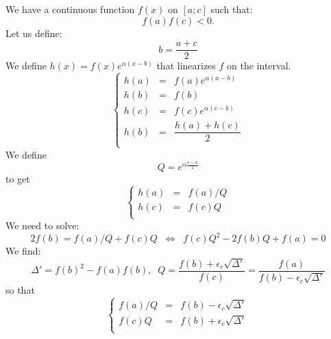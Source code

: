 \documentclass[aps,12pt]{revtex4}
\begin{document}
We have a continuous function $f(x)$ on $[a;c]$ such that:
 $$f(a)f(c)<0.$$
Let us define:
$$
	b = \dfrac{a+c}{2}
$$
We define $h(x)=f(x)e^{\alpha(x-b)}$ that linearizes $f$ on the interval.
$$
\left\lbrace
\begin{array}{rcl}
	h(a) & = & f(a)e^{\alpha(a-b)}\\
	h(b) & = & f(b)\\
	h(c) & = & f(c) e^{\alpha(c-b)}\\
	h(b) & = & \dfrac{h(a)+h(c)}{2}\\
\end{array}
\right.
$$
We define
$$
Q = e^{\alpha\frac{c-a}{2}}
$$
to get
$$	
\left\lbrace
\begin{array}{rcl}
	h(a) & = & f(a)/Q\\
 	h(c) & = & f(c)Q\\
\end{array}
\right.
$$
We need to solve:
$$
	2f(b) = f(a)/Q+f(c)Q \;\; \Leftrightarrow \;\; f(c)Q^2 - 2 f(b) Q + f(a) = 0
$$
We find:
$$
	\Delta' = f(b)^2 - f(a)f(b), \;\; Q = \dfrac{f(b)+\epsilon_c \sqrt{\Delta'}}{f(c)} = \dfrac{f(a)}{f(b)-\epsilon_c \sqrt{\Delta'}}
$$
so that
$$
\left\lbrace
\begin{array}{rcl}
	f(a)/Q & = & f(b) - \epsilon_c \sqrt{\Delta'}\\
	f(c) Q & = & f(b) + \epsilon_c \sqrt{\Delta'}\\
\end{array}
\right.
$$
\end{document}
